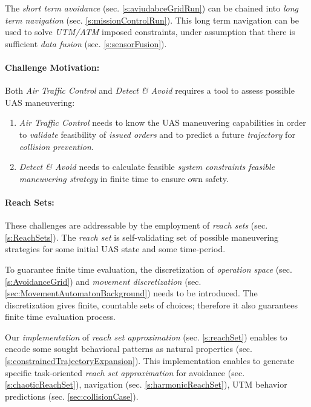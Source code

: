The \emph{short term avoidance} (sec. \ref{s:aviudabceGridRun}) can be chained into \emph{long term navigation} (sec. \ref{s:missionControlRun}). This long term navigation can be used to solve \emph{UTM/ATM} imposed constraints, under assumption that there is sufficient \emph{data fusion} (sec. \ref{s:sensorFusion}).

\paragraph{Challenge Motivation:} Both \emph{Air Traffic Control} and \emph{Detect \& Avoid} requires a tool to assess possible UAS maneuvering:

\begin{enumerate}
    \item \emph{Air Traffic Control} needs to know the UAS maneuvering capabilities in order to \emph{validate} feasibility of \emph{issued orders} and to predict a future \emph{trajectory} for \emph{collision prevention}.
    
    \item \emph{Detect \& Avoid} needs to calculate feasible \emph{system constraints feasible maneuvering strategy} in finite time to ensure own safety. 
\end{enumerate}

\paragraph{Reach Sets:} These challenges are addressable by the  employment of \emph{reach sets} (sec. \ref{s:ReachSets}). The \emph{reach set} is self-validating set of possible maneuvering strategies for some initial UAS state and some time-period. 

To guarantee finite time evaluation, the discretization of \emph{operation space} (sec. \ref{s:AvoidanceGrid}) and \emph{movement discretization} (sec. \ref{sec:MovementAutomatonBackground}) needs to be introduced. The discretization gives finite, countable sets of choices; therefore it also guarantees finite time evaluation process.

Our \emph{implementation} of \emph{reach set approximation} (sec. \ref{s:reachSet}) enables to encode some sought behavioral patterns as natural properties (sec. \ref{s:constrainedTrajectoryExpansion}). This implementation enables to generate specific task-oriented \emph{reach set approximation} for avoidance (sec. \ref{s:chaoticReachSet}), navigation (sec. \ref{s:harmonicReachSet}), UTM behavior predictions (sec. \ref{sec:collisionCase}). 

